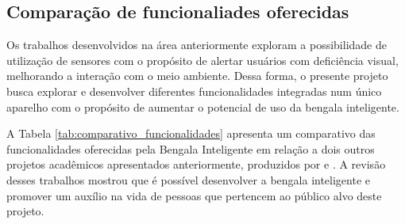     \subsection{Comparação de funcionaliades oferecidas}
    
    Os trabalhos desenvolvidos na área anteriormente exploram a possibilidade de utilização de sensores com o propósito de alertar usuários com deficiência visual, melhorando a interação com o meio ambiente. Dessa forma, o presente projeto busca explorar e desenvolver diferentes funcionalidades integradas num único aparelho com o propósito de aumentar o potencial de uso da bengala inteligente. 

    
    A Tabela \ref{tab:comparativo_funcionalidades} apresenta um comparativo das funcionalidades oferecidas pela Bengala Inteligente em relação a dois outros projetos acadêmicos apresentados anteriormente, produzidos por \cite{Rigolon} e \cite{BengalaAutomatizadaArduino}. A revisão desses trabalhos mostrou que é possível desenvolver a bengala inteligente e promover um auxílio na vida de pessoas que pertencem ao público alvo deste projeto.

